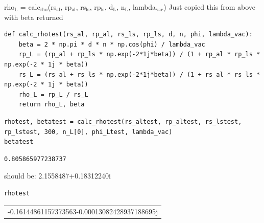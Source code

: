 \documentclass[11pt]{article}
\begin{document}
rho\(_{\text{L}}\) = calc\(_{\text{rho}}\)(rs\(_{\text{al}}\), rp\(_{\text{al}}\), rs\(_{\text{ls}}\), rp\(_{\text{ls}}\), d\(_{\text{L}}\), n\(_{\text{L}}\), lambda\(_{\text{vac}}\))
 Just copied this from above with beta returned 
\begin{verbatim}
def calc_rhotest(rs_al, rp_al, rs_ls, rp_ls, d, n, phi, lambda_vac):
    beta = 2 * np.pi * d * n * np.cos(phi) / lambda_vac
    rp_L = (rp_al + rp_ls * np.exp(-2*1j*beta)) / (1 + rp_al * rp_ls * np.exp(-2 * 1j * beta))
    rs_L = (rs_al + rs_ls * np.exp(-2*1j*beta)) / (1 + rs_al * rs_ls * np.exp(-2 * 1j * beta))
    rho_L = rp_L / rs_L
    return rho_L, beta
\end{verbatim}

\begin{verbatim}
rhotest, betatest = calc_rhotest(rs_altest, rp_altest, rs_lstest, rp_lstest, 300, n_L[0], phi_Ltest, lambda_vac)
betatest
\end{verbatim}

\begin{verbatim}
0.805865977238737
\end{verbatim}
should be: 2.1558487+0.18312240i

\begin{verbatim}
rhotest 
\end{verbatim}

\begin{center}
\begin{tabular}{l}
-0.16144861157373563-0.00013082428937188695j\\
\end{tabular}
\end{center}




\end{document}
